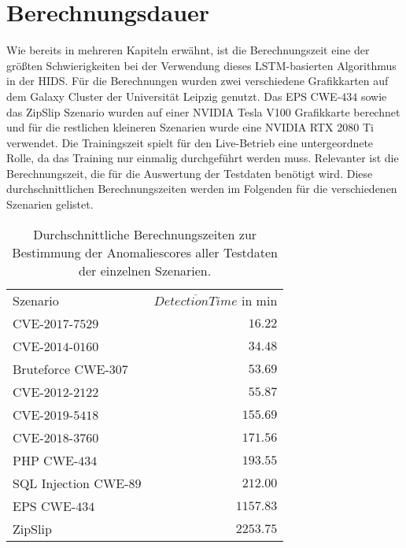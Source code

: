 \section{Berechnungsdauer}\label{sec:erg_time}
    Wie bereits in mehreren Kapiteln erwähnt, ist die Berechnungszeit eine der größten Schwierigkeiten bei der Verwendung dieses \ac{LSTM}-basierten Algorithmus in der \ac{HIDS}.
    Für die Berechnungen wurden zwei verschiedene Grafikkarten auf dem Galaxy Cluster der Universität Leipzig genutzt.
    Das EPS CWE-$434$ sowie das ZipSlip Szenario wurden auf einer NVIDIA Tesla V100 Grafikkarte berechnet und für die restlichen kleineren Szenarien wurde eine NVIDIA RTX 2080 Ti verwendet.
    Die Trainingszeit spielt für den Live-Betrieb eine untergeordnete Rolle, da das Training nur einmalig durchgeführt werden muss.
    Relevanter ist die Berechnungszeit, die für die Auswertung der Testdaten benötigt wird.
    Diese durchschnittlichen Berechnungszeiten werden im Folgenden für die verschiedenen Szenarien gelistet.
    \begin{table}[ht]
        \centering
        \begin{tabular}{lr}
            \hline
            \rowcolor{GruvGray!36}
            \multicolumn{2}{c}{Berechnungszeiten der verschiedenen Szenarien}\\
            \toprule
            Szenario &  $\overline{Detection Time}$ in min\\
            \midrule
            \rowcolor{GruvGray!16}
            CVE-$2017$-$7529$ & $16.22$ \\
            CVE-$2014$-$0160$ & $34.48$ \\
            \rowcolor{GruvGray!16}
            Bruteforce CWE-$307$ & $53.69$ \\
            CVE-$2012$-$2122$ & $55.87$ \\
            \rowcolor{GruvGray!16}
            CVE-$2019$-$5418$ & $155.69$ \\
            CVE-$2018$-$3760$ & $171.56$ \\
            \rowcolor{GruvGray!16}
            PHP CWE-$434$ & $193.55$ \\
            SQL Injection CWE-$89$ & $212.00$ \\
            \rowcolor{GruvGray!16}
            EPS CWE-$434$ & $1157.83$ \\	
            ZipSlip & $2253.75$ \\	
            \hline
        \end{tabular}
        \caption[Ergebnisse Berechnungsdauer Szenarien]{Durchschnittliche Berechnungszeiten zur Bestimmung der Anomaliescores aller Testdaten der einzelnen Szenarien.}
        \label{tab:LSTM_erg_time}
    \end{table}
